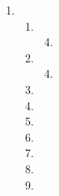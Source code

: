 \documentclass[letterpaper]{article}
\begin{document}
\renewcommand{\labelenumi}{1.\arabic{enumi}}
\renewcommand{\labelenumii}{\arabic{enumii}.}
\renewcommand{\labelenumiii}{(\alph{enumiii})}
\begin{enumerate}
\item
  \begin{enumerate}
  \item
    \begin{enumerate}
    \setcounter{enumiii}{3}
    \item
    \end{enumerate}
  \item
    \begin{enumerate}
    \setcounter{enumiii}{3}
    \item
    \end{enumerate}
  \setcounter{enumii}{6}
  \item
  \setcounter{enumii}{9}
  \item
  \item
  \setcounter{enumii}{12}
  \item
  \item
  \setcounter{enumii}{16}
  \item
  \item
  \end{enumerate}
\end{enumerate}
\end{document}

